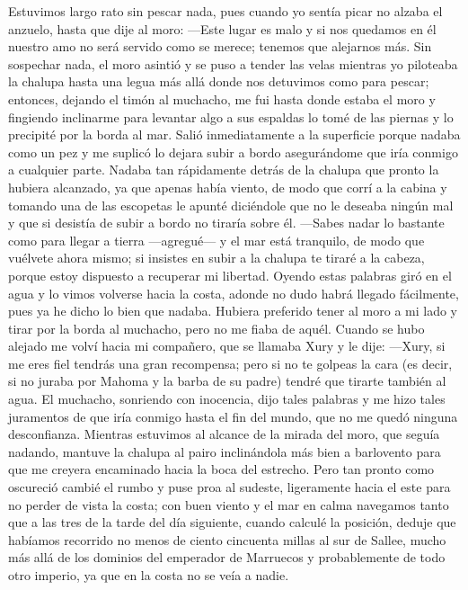 \documentclass{novela}
\begin{document}
    Estuvimos largo rato sin pescar nada, pues cuando yo sentía picar no alzaba el anzuelo, hasta que dije al moro:
    —Este lugar es malo y si nos quedamos en él nuestro amo no será servido como se merece; tenemos que alejarnos más.
    Sin sospechar nada, el moro asintió y se puso a tender las velas mientras yo piloteaba la chalupa hasta una legua más allá donde nos detuvimos como para pescar; entonces, dejando el timón al muchacho, me fui hasta donde estaba el moro y fingiendo inclinarme para levantar algo a sus espaldas lo tomé de las piernas y lo precipité por la borda al mar. Salió inmediatamente a la superficie porque nadaba como un pez y me suplicó lo dejara subir a bordo asegurándome que iría conmigo a cualquier parte. Nadaba tan rápidamente detrás de la chalupa que pronto la hubiera alcanzado, ya que apenas había viento, de modo que corrí a la cabina y tomando una de las escopetas le apunté diciéndole que no le deseaba ningún mal y que si desistía de subir a bordo no tiraría sobre él.
    —Sabes nadar lo bastante como para llegar a tierra —agregué— y el mar está tranquilo, de modo que vuélvete ahora mismo; si insistes en subir a la chalupa te tiraré a la cabeza, porque estoy dispuesto a recuperar mi libertad.
    Oyendo estas palabras giró en el agua y lo vimos volverse hacia la costa, adonde no dudo habrá llegado fácilmente, pues ya he dicho lo bien que nadaba.
    Hubiera preferido tener al moro a mi lado y tirar por la borda al muchacho, pero no me fiaba de aquél. Cuando se hubo alejado me volví hacia mi compañero, que se llamaba Xury y le dije:
    —Xury, si me eres fiel tendrás una gran recompensa; pero si no te golpeas la cara (es decir, si no juraba por Mahoma y la barba de su padre) tendré que tirarte también al agua.
    El muchacho, sonriendo con inocencia, dijo tales palabras y me hizo tales juramentos de que iría conmigo hasta el fin del mundo, que no me quedó ninguna desconfianza.
    Mientras estuvimos al alcance de la mirada del moro, que seguía nadando, mantuve la chalupa al pairo inclinándola más bien a barlovento para que me creyera encaminado hacia la boca del estrecho. Pero tan pronto como oscureció cambié el rumbo y puse proa al sudeste, ligeramente hacia el este para no perder de vista la costa; con buen viento y el mar en calma navegamos tanto que a las tres de la tarde del día siguiente, cuando calculé la posición, deduje que habíamos recorrido no menos de ciento cincuenta millas al sur de Sallee, mucho más allá de los dominios del emperador de Marruecos y probablemente de todo otro imperio, ya que en la costa no se veía a nadie.
\end{document}
